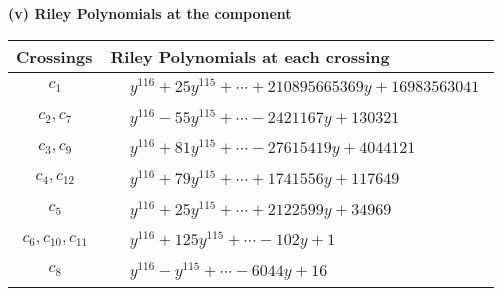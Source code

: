 \documentclass[1p]{elsarticle_modified}
\theoremstyle{definition}
\begin{document}
\newpage\renewcommand{\arraystretch}{1}
\flushleft \textbf{(v) Riley Polynomials at the component}\newline \\
\begin{tabular}{m{50pt}|m{274pt}}
Crossings & \hspace{64pt}Riley Polynomials at each crossing \\
\hline $$\begin{aligned}c_{1}\end{aligned}$$&$\begin{aligned}
&y^{116}+25 y^{115}+\cdots+210895665369 y+16983563041
\end{aligned}$\\
\hline $$\begin{aligned}c_{2},c_{7}\end{aligned}$$&$\begin{aligned}
&y^{116}-55 y^{115}+\cdots-2421167 y+130321
\end{aligned}$\\
\hline $$\begin{aligned}c_{3},c_{9}\end{aligned}$$&$\begin{aligned}
&y^{116}+81 y^{115}+\cdots-27615419 y+4044121
\end{aligned}$\\
\hline $$\begin{aligned}c_{4},c_{12}\end{aligned}$$&$\begin{aligned}
&y^{116}+79 y^{115}+\cdots+1741556 y+117649
\end{aligned}$\\
\hline $$\begin{aligned}c_{5}\end{aligned}$$&$\begin{aligned}
&y^{116}+25 y^{115}+\cdots+2122599 y+34969
\end{aligned}$\\
\hline $$\begin{aligned}c_{6},c_{10},c_{11}\end{aligned}$$&$\begin{aligned}
&y^{116}+125 y^{115}+\cdots-102 y+1
\end{aligned}$\\
\hline $$\begin{aligned}c_{8}\end{aligned}$$&$\begin{aligned}
&y^{116}- y^{115}+\cdots-6044 y+16
\end{aligned}$\\
\hline
\end{tabular}\\~\\
\end{document}
